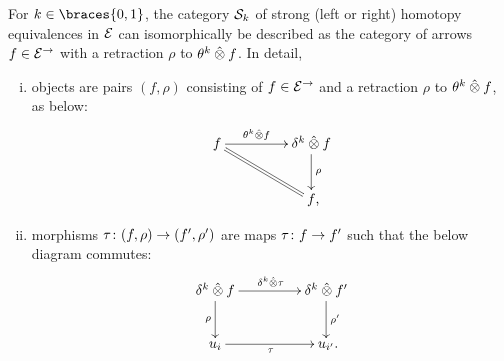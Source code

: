 \documentclass[reqno,10pt,a4paper,oneside,draft]{amsart}
\begin{document}
\begin{lemma} \label{strong-h-equiv-as-section}
For $k \in \braces{0, 1}$, the category $\cal{S}_k$ of strong (left or right) homotopy equivalences in $\catE$ can isomorphically be described as the category of arrows $f \in \catE^{\to}$ with a retraction $\rho$ to $\thetak \hatotimes f$.
In detail,
\begin{enumerate}[(i)]
\item objects are pairs $(f, \rho)$ consisting of $f \in \catE^\to$ and a retraction $\rho$ to $\thetak \hatotimes f$, as below:
\[
\xymatrix@C+2em{
  f
  \ar[r]^-{\thetak \hatotimes f}
  \ar@{=}[dr]
&
  \kcyl \hatotimes f \ar[d]^{\rho}
\\&
  f
\rlap{,}}
\]
\item morphisms $\tau \co (f, \rho) \to (f', \rho')$ are maps $\tau \co f \to f'$ such that the below diagram commutes:
\[
\xymatrix@C+2em{
  \kcyl \hatotimes f
  \ar[d]_-{\rho}
  \ar[r]^{\kcyl \hatotimes \tau}
&
 \kcyl \hatotimes f'
  \ar[d]^-{\rho'}
\\
  u_i
  \ar[r]_{\tau}
&
  u_{i'}
\rlap{.}}
\]
\end{enumerate}
\end{lemma}
\end{document}
